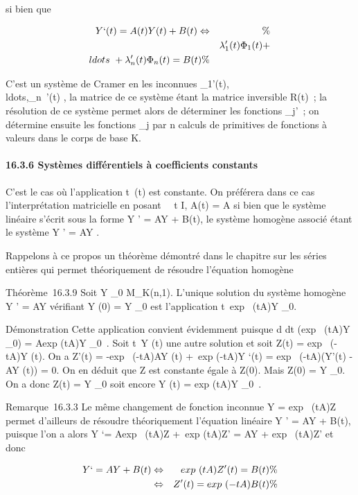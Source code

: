 \documentclass[]{article}
\begin{document}
si bien que

\begin{align*} Y `(t) = A(t)Y (t) + B(t)
\Leftrightarrow&& \%& \\
& & \lambda_1'(t)\Phi_1(t) +
\\ldots~ +
\lambda_n'(t)\Phi_n(t) = B(t)\%&
\\ \end{align*}

C'est un système de Cramer en les inconnues
\lambda_1'(t),\\ldots,\lambda_n~'(t)
, la matrice de ce système étant la matrice inversible R(t)~; la
résolution de ce système permet alors de déterminer les fonctions
\lambda_j'~; on détermine ensuite les fonctions \lambda_j par n
calculs de primitives de fonctions à valeurs dans le corps de base K.

\paragraph{16.3.6 Systèmes différentiels à coefficients constants}

C'est le cas où l'application t\mapsto~\ell(t) est
constante. On préférera dans ce cas l'interprétation matricielle en
posant \forall~~t \in I, A(t) = A si bien que le système
linéaire s'écrit sous la forme Y ' = AY + B(t), le système homogène
associé étant le système Y ' = AY .

Rappelons à ce propos un théorème démontré dans le chapitre sur les
séries entières qui permet théoriquement de résoudre l'équation homogène

Théorème~16.3.9 Soit Y _0 \in M_K(n,1). L'unique
solution du système homogène Y ' = AY vérifiant Y (0) = Y _0
est l'application
t\mapsto~exp~ (tA)Y
_0.

Démonstration Cette application convient évidemment puisque  d
\over dt (exp~ (tA)Y
_0) = Aexp (tA)Y _0~. Soit
t\mapsto~Y (t) une autre solution et soit Z(t)
= exp~ (-tA)Y (t). On a Z'(t) =
-exp~ (-tA)AY (t) +\
exp (-tA)Y `(t) = exp~ (-tA)(Y'(t) - AY (t))
= 0. On en déduit que Z est constante égale à Z(0). Mais Z(0) = Y
_0. On a donc Z(t) = Y _0 soit encore Y (t)
= exp (tA)Y _0~.

Remarque~16.3.3 Le même changement de fonction inconnue Y
= exp~ (tA)Z permet d'ailleurs de résoudre
théoriquement l'équation linéaire Y ' = AY + B(t), puisque l'on a alors
Y `= Aexp~ (tA)Z +\
exp (tA)Z' = AY + exp~ (tA)Z' et donc

\begin{align*} Y `= AY + B(t)&
\Leftrightarrow & exp~ (tA)Z'(t)
= B(t) \%& \\ &
\Leftrightarrow & Z'(t) = exp~
(-tA)B(t)\%& \\
\end{align*}
\end{document}
